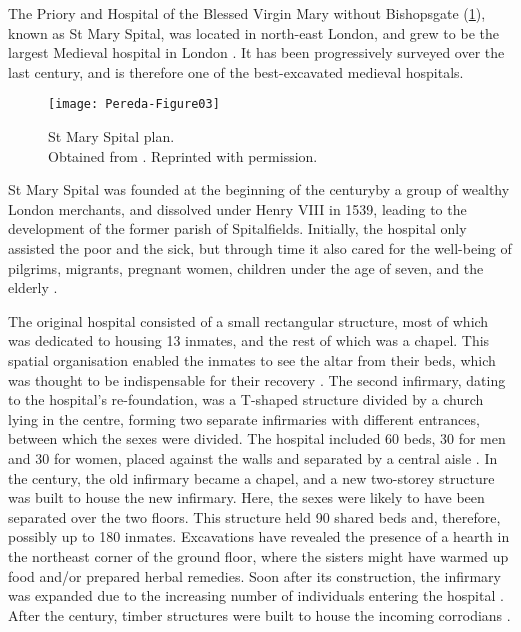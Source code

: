 The Priory and Hospital of the Blessed Virgin Mary without Bishopsgate (\cref{fig:Pereda-Figure03}), %
known as St Mary Spital, was located in north-east London, and grew to be the largest Medieval hospital in London \parencite[60]{Bowers_2007}. It has been progressively surveyed over the last century, and is therefore one of the best-excavated medieval hospitals. 
\begin{figure}[!b]
		\texttt{[image: Pereda-Figure03]}
		\caption{St Mary Spital plan.
		        {\normalfont\scriptsize \\ Obtained from \textcite[98, fig. 37]{Thomas_2002}.
						Reprinted with permission.
		                  }}
		\label{fig:Pereda-Figure03}
	\end{figure}
St Mary Spital was founded at the beginning of the  century\AD by a group of wealthy London merchants, and dissolved under Henry VIII in 1539, leading to the development of the former parish of Spitalfields. Initially, the hospital only assisted the poor and the sick, but through time it also cared for the well-being of pilgrims, migrants, pregnant women, children under the age of seven, and the elderly \parencites[26]{Phillpotts_1997}[48-49]{Thomas_2002}{Unknown_1957}[60-61]{White_2007}.

The original hospital consisted of a small rectangular structure, most of which was dedicated to housing 13 inmates, and the rest of which was a chapel. This spatial organisation enabled the inmates to see the altar from their beds, which was thought to be indispensable for their recovery \parencites[91]{Phillpotts_1997}[98]{Thomas_2002}.
The second infirmary, dating to the hospital’s re-foundation, was a T-shaped structure divided by a church lying in the centre, forming two separate infirmaries with different entrances, between which the sexes were divided. The hospital included 60 beds, 30 for men and 30 for women, placed against the walls and separated by a central aisle \parencites[37]{Phillpotts_1997}[99]{Thomas_2002}. 
In the  century\AD, the old infirmary became a chapel, and a new two-storey structure was built to house the new infirmary. Here, the sexes were likely to have been separated over the two floors. This structure held 90 shared beds and, therefore, possibly up to 180 inmates.
Excavations have revealed the presence of a hearth in the northeast corner of the ground floor, where the sisters might have warmed up food and/or prepared herbal remedies. Soon after its construction, the infirmary was expanded due to the increasing number of individuals entering the hospital \parencites[47]{Phillpotts_1997}[99]{Thomas_2002}[59]{White_2007}. 
After the  century\AD, timber structures were built to house the incoming corrodians \parencite[104,152]{Thomas_2002}.

